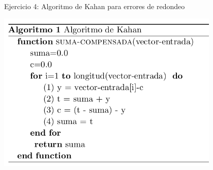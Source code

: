 		\begin{frame}{Ejercicio 4: Algoritmo de Kahan para errores de redondeo}	

			\centering
			\includegraphics[width=0.8\textwidth]{./Images/kahan.png}
											
		\end{frame}	
		
